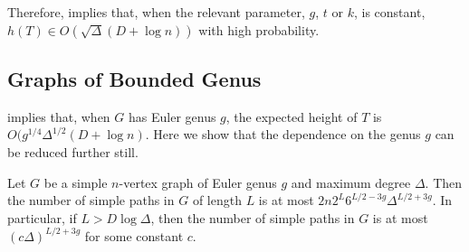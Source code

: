 \documentclass[lotsofwhite]{patmorin}
\begin{document}
Therefore,  implies that,
when the relevant parameter, $g$, $t$ or $k$, is constant, $h(T)\in
O(\sqrt{\Delta}(D+\log n))$ with high probability.  



\subsection{Graphs of Bounded Genus}

 implies that, when $G$ has Euler genus $g$,
the expected height of $T$ is $O(g^{1/4}\Delta^{1/2}(D+\log n)$.  Here we
show that the dependence on the genus $g$ can be reduced further still.

\begin{lem}
   Let $G$ be a simple $n$-vertex graph of Euler genus $g$ and maximum degree
   $\Delta$. Then the number of simple paths in $G$ of length $L$
   is at most $2n2^{L}6^{L/2-3g}\Delta^{L/2+3g}$.
   In particular, if $L>D\log\Delta$, then the number of simple paths in $G$
   is at most $(c\Delta)^{L/2+3g}$ for some constant $c$.
\end{lem}
\end{document}
